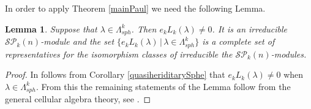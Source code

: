 \documentclass[10pt,hidelinks]{article}
\newcommand{\SpheAlg}{{\mathcal{SP} }_{k}}
\newtheorem{lemma}[theorem]{Lemma}
\numberwithin{equation}{section}
\begin{document}
\medskip
In order to apply Theorem \ref{mainPaul} we need the following Lemma.
\begin{lemma}\label{weneedthe}
  Suppose that $ \lambda \in \Lambda_{sph}^{k}$. Then $ e_k L_k(\lambda) \neq 0 $. It is an irreducible $ \SpheAlg(n) $-module and
  the set $ \{  e_k L_k(\lambda)  \, | \,  \lambda \in \Lambda_{sph}^{k} \} $ is a complete set of representatives for the
  isomorphism classes of irreducible the $ \SpheAlg(n) $-modules. 
  \end{lemma}
\begin{proof}

In follows from Corollary \ref{quasiheriditarySphe} that $ e_k L_k(\lambda) \neq 0 $ when $ \lambda \in 
\Lambda_{sph}^{k} $. From this the remaining statements of the Lemma follow from the
general cellular algebra theory, see \cite{GL}. 
\end{proof}
\end{document}

